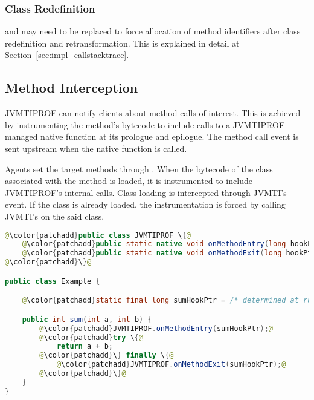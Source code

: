 \subsubsection*{Class Redefinition}

 and  may need to be replaced to force allocation of method identifiers after class redefinition and retransformation. This is explained in detail at Section~\ref{sec:impl_callstacktrace}.

\subsection{Method Interception}

JVMTIPROF can notify clients about method calls of interest. This is achieved by instrumenting the method's bytecode to include calls to a JVMTIPROF-managed native function at its prologue and epilogue. The method call event is sent upstream when the native function is called.

Agents set the target methods through . When the bytecode of the class associated with the method is loaded, it is instrumented to include JVMTIPROF's internal calls. Class loading is intercepted through JVMTI's   event. If the class is already loaded, the instrumentation is forced by calling JVMTI's  on the said class.

\medskip
\begin{lstlisting}[language=Java,frame=tb,escapechar=@,captionpos=b,caption=Example instrumentation applied by method interception. Instrumented code is in green. The \code{sum} method is modified such that JVMTIPROF is notified about entries and exits on it.,label=lst:method_interception_instrumentation]
@\color{patchadd}public class JVMTIPROF \{@
    @\color{patchadd}public static native void onMethodEntry(long hookPtr);@
    @\color{patchadd}public static native void onMethodExit(long hookPtr);@
@\color{patchadd}\}@

public class Example {

    @\color{patchadd}static final long sumHookPtr = /* determined at runtime */;@

    public int sum(int a, int b) {
        @\color{patchadd}JVMTIPROF.onMethodEntry(sumHookPtr);@
        @\color{patchadd}try \{@
            return a + b;
        @\color{patchadd}\} finally \{@
            @\color{patchadd}JVMTIPROF.onMethodExit(sumHookPtr);@
        @\color{patchadd}\}@
    }
}
\end{lstlisting}

